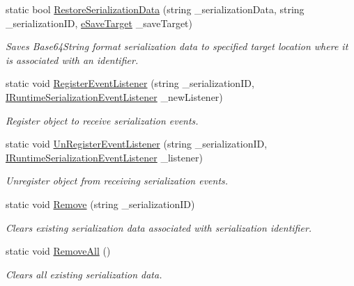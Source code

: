 \begin{DoxyCompactItemize}
static bool \hyperlink{class_voxel_busters_1_1_runtime_serialization_1_1_r_s_manager_a9c0963c7dad73a4331c53ec8937c889c}{Restore\+Serialization\+Data} (string \+\_\+serialization\+Data, string \+\_\+serialization\+I\+D, \hyperlink{namespace_voxel_busters_1_1_runtime_serialization_aacaa3008b2cb441fbe4708df854019bf}{e\+Save\+Target} \+\_\+save\+Target)
\begin{DoxyCompactList}\small\item\em Saves Base64\+String format serialization data to specified target location where it is associated with an identifier. \end{DoxyCompactList}\item 
static void \hyperlink{class_voxel_busters_1_1_runtime_serialization_1_1_r_s_manager_a66f9398473654f1ba786049512c6c228}{Register\+Event\+Listener} (string \+\_\+serialization\+I\+D, \hyperlink{interface_voxel_busters_1_1_runtime_serialization_1_1_i_runtime_serialization_event_listener}{I\+Runtime\+Serialization\+Event\+Listener} \+\_\+new\+Listener)
\begin{DoxyCompactList}\small\item\em Register object to receive serialization events. \end{DoxyCompactList}\item 
static void \hyperlink{class_voxel_busters_1_1_runtime_serialization_1_1_r_s_manager_af0b7b8a2966346bbc84bfcb469894764}{Un\+Register\+Event\+Listener} (string \+\_\+serialization\+I\+D, \hyperlink{interface_voxel_busters_1_1_runtime_serialization_1_1_i_runtime_serialization_event_listener}{I\+Runtime\+Serialization\+Event\+Listener} \+\_\+listener)
\begin{DoxyCompactList}\small\item\em Unregister object from receiving serialization events. \end{DoxyCompactList}\item 
static void \hyperlink{class_voxel_busters_1_1_runtime_serialization_1_1_r_s_manager_afc15ae076f5d17b9b2a9f70aa6e9630d}{Remove} (string \+\_\+serialization\+I\+D)
\begin{DoxyCompactList}\small\item\em Clears existing serialization data associated with serialization identifier. \end{DoxyCompactList}\item 
static void \hyperlink{class_voxel_busters_1_1_runtime_serialization_1_1_r_s_manager_ae181b60d8c24114b8c417b74a51bff12}{Remove\+All} ()
\begin{DoxyCompactList}\small\item\em Clears all existing serialization data. \end{DoxyCompactList}\item 

\end{DoxyCompactItemize}
